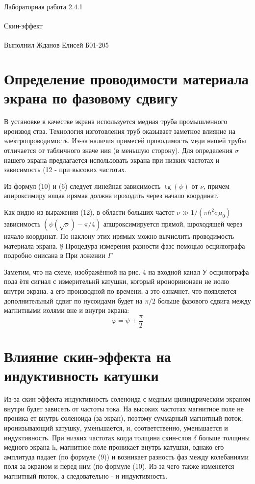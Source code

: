 \documentclass{astroedu-lab}
\begin{document}
\begin{problem}{\huge Лабораторная работа 2.4.1\\\\Скин-эффект\\\\Выполнил Жданов Елисей Б01-205}
\section{Определение проводимости материала экрана по фазовому сдвигу}

В установке в качестве экрана используется медная труба промышленного ироизвод ства. Технология изготовления труб оказывает заметное влияние на электропроводимость. Из-за наличия примесей проводимость меди нашей трубы отличается от табличного значе ния (в меньшую сторону). Для определения $\sigma$ нашего экрана предлагается использовать экрана при низких частотах и зависимость (12 - при высоких частотах.

Из формул (10) и (6) следует линейная зависимость $\operatorname{tg}(\psi)$ от $\nu$, причем апироксимиру ющая ирямая должна ироходить через начало координат.

Как видно из выражения (12), в области больших частот $\nu \gg 1 /\left(\pi h^2 \sigma \mu_0\right)$ зависимость $(\psi(\sqrt{\nu})-\pi / 4)$ апшроксимируется прямой, шроходящей через начало координат. По наклону этих ирямых можно вычислить проводимость материала экрана.
$\underline{8}$
Процедура измерения разности фазс помоцью осцилюграфа подробно оиисана в При ложении $\Gamma$

Заметим, что на схеме, изображённой на рис. 4 на входной канал У осцилюграфа пода ётя сигнал с измерительнй катушки, когорый иронориионаен не иолю внутри экрана. а его производной по времени, а это означнет, что появляется дополнительный сдвиг по нусоидами будет на $\pi / 2$ больше фазового сдвига между магнитными иолями вне и внугри экрана:
$$
\varphi=\psi+\frac{\pi}{2}
$$

\section{Влияние скин-эффекта на индуктивность катушки}

Из-за скин эффекта индуктивность соленоида с медным цилиндрическим экраном внутри будет зависеть от частоты тока. На высоких частотах магнитное поле не проника ет внутрь соленоида (за экран), поэтому суммарный магнитный поток, иронизывающий катушку, уменьшается, и, соответственно, уменьшается и индуктивность. При низких частотах когда толщина скин-слоя $\delta$ больше толщины медного экрана h, магнитное поле
проникает внутрь катушки, однако его амплитуда падает (по формуле (9)) и возникает разность фаз между колебаниями поля за экраном и перед ним (по формуле (10). Из-за чего также изменяется магнитный пюток, а следовательно - и индуктивность.


\end{problem}
\end{document}
